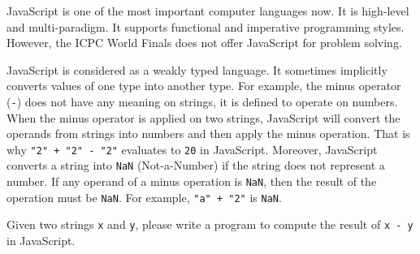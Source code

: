 JavaScript is one of the most important computer languages now.
It is high-level and multi-paradigm.
It supports functional and imperative programming styles.
However, the ICPC World Finals does not offer JavaScript
for problem solving.

JavaScript is considered as a weakly typed language.
It sometimes implicitly converts values of one type into another type.
For example, the minus operator (\verb|-|) does not have any meaning on strings,
it is defined to operate on numbers. 
When the minus operator is applied on two strings, JavaScript will convert
the operands from strings into numbers and then apply the minus operation.
That is why \verb|"2" + "2" - "2"| evaluates to \verb+20+ in JavaScript.
Moreover,
JavaScript converts a string into \verb+NaN+ 
(Not-a-Number) if the string does not represent a number. 
If any operand of a minus operation is \verb+NaN+, 
then the result of the operation must be \verb+NaN+.
For example, \verb|"a" + "2"| is \verb+NaN+.

Given two strings \verb+x+ and \verb+y+, 
please write a program to compute the result 
of \verb|x - y| in JavaScript.
